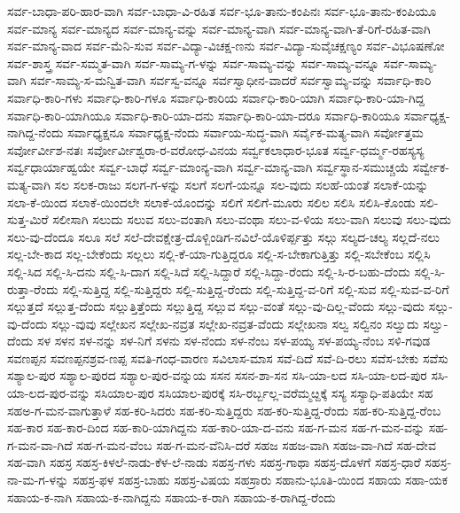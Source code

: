 ಸರ್ವ-ಬಾಧಾ-ಪರಿ-ಹಾರ-ವಾಗಿ
ಸರ್ವ-ಬಾಧಾ-ವಿ-ರಹಿತ
ಸರ್ವ-ಭೂ-ತಾನು-ಕಂಪಿನಃ
ಸರ್ವ-ಭೂ-ತಾನು-ಕಂಪಿಯೂ
ಸರ್ವ-ಮಾನ್ಯ
ಸರ್ವ-ಮಾನ್ಯದ
ಸರ್ವ-ಮಾನ್ಯ-ವನ್ನು
ಸರ್ವ-ಮಾನ್ಯ-ವಾಗಿ
ಸರ್ವ-ಮಾನ್ಯ-ವಾಗಿ-ತೆ-ರಿಗೆ-ರಹಿತ-ವಾಗಿ
ಸರ್ವ-ಮಾನ್ಯ-ವಾದ
ಸರ್ವ-ಮೆನಿ-ಸುವ
ಸರ್ವ-ವಿದ್ಯಾ-ವಿಚಕ್ಷ-ಣನು
ಸರ್ವ-ವಿದ್ಯಾ-ಸುವೈಚಕ್ಷಣ್ಯಂ
ಸರ್ವ-ವಿಭೂಷಣೋ
ಸರ್ವ-ಶಾಸ್ತ್ರ
ಸರ್ವ-ಸಮ್ಮತ-ವಾಗಿ
ಸರ್ವ-ಸಾಮ್ಯ-ಗ-ಳನ್ನು
ಸರ್ವ-ಸಾಮ್ಯ-ವನ್ನು
ಸರ್ವ-ಸಾಮ್ಯ-ವನ್ನೂ
ಸರ್ವ-ಸಾಮ್ಯ-ವಾಗಿ
ಸರ್ವ-ಸಾಮ್ಯ-ಸ-ಮನ್ವಿತ-ವಾಗಿ
ಸರ್ವಸ್ವ-ವನ್ನೂ
ಸರ್ವಸ್ವಾಧೀನ-ವಾದರೆ
ಸರ್ವಸ್ವಾಮ್ಯ-ವನ್ನು
ಸರ್ವಾಧಿ-ಕಾರಿ
ಸರ್ವಾಧಿ-ಕಾರಿ-ಗಳು
ಸರ್ವಾಧಿ-ಕಾರಿ-ಗಳೂ
ಸರ್ವಾಧಿ-ಕಾರಿಯ
ಸರ್ವಾಧಿ-ಕಾರಿ-ಯಾಗಿ
ಸರ್ವಾಧಿ-ಕಾರಿ-ಯಾ-ಗಿದ್ದ
ಸರ್ವಾಧಿ-ಕಾರಿ-ಯಾಗಿಯೂ
ಸರ್ವಾಧಿ-ಕಾರಿ-ಯಾ-ದನು
ಸರ್ವಾಧಿ-ಕಾರಿ-ಯಾ-ದರೂ
ಸರ್ವಾಧಿ-ಕಾರಿಯೂ
ಸರ್ವಾಧ್ಯಕ್ಷ-ನಾಗಿದ್ದ-ನೆಂದು
ಸರ್ವಾಧ್ಯಕ್ಷನೂ
ಸರ್ವಾಧ್ಯಕ್ಷ-ನೆಂದು
ಸರ್ವಾಯ-ಸುದ್ಧ-ವಾಗಿ
ಸರ್ವೈಕ-ಮತ್ಯ-ವಾಗಿ
ಸರ್ವೋತ್ತಮ
ಸರ್ವೋರ್ವೀಶ-ನತಃ
ಸರ್ವೋರ್ವೀಶ್ವರಾ-ರ-ವರೋಧ-ವಿನಯ
ಸರ್ವ್ವಕಲಾಧಾರ-ಭೂತ
ಸರ್ವ್ವ-ಧರ್ಮ್ಮ-ರಹಸ್ಯಸ್ಯ
ಸರ್ವ್ವಧಾರ್ಯಾಹ್ವಯೇ
ಸರ್ವ್ವ-ಬಾಧೆ
ಸರ್ವ್ವ-ಮಾಂನ್ಯ-ವಾಗಿ
ಸರ್ವ್ವ-ಮಾನ್ಯ-ವಾಗಿ
ಸರ್ವ್ವಸ್ಥಾನ-ಸಮುಚ್ಚಯೆ
ಸರ್ವ್ವೇಕ-ಮತ್ಯ-ವಾಗಿ
ಸಲ
ಸಲಕ-ರಾಜು
ಸಲಗ-ಗ-ಳನ್ನು
ಸಲಗೆ
ಸಲಗೆ-ಯನ್ನೂ
ಸಲ-ವುದು
ಸಲಹೆ-ಯಂತೆ
ಸಲಾಕೆ-ಯನ್ನು
ಸಲಾ-ಕೆ-ಯಿಂದ
ಸಲಾಕೆ-ಯಿಂದಲೇ
ಸಲಾಕೆ-ಯೊಂದನ್ನು
ಸಲಿಗೆ
ಸಲಿಗೆ-ಮೂರು
ಸಲಿಲ
ಸಲಿಸಿ
ಸಲಿಸಿ-ಕೊಂಡು
ಸಲಿ-ಸುತ್ತ-ಮಿರೆ
ಸಲೀಸಾಗಿ
ಸಲುದು
ಸಲುವ
ಸಲು-ವಂತಾಗಿ
ಸಲು-ವಂಥಾ
ಸಲು-ವ-ಳಿಯ
ಸಲು-ವಾಗಿ
ಸಲುವು
ಸಲು-ವುದು
ಸಲು-ವು-ದೆಂದೂ
ಸಲೂ
ಸಲೆ
ಸಲೆ-ದೇವಕ್ಷೇತ್ರ-ದೊಳ್ಬಿಂಡಿಗ-ನವಿಲೆ-ಯೊಳಿರ್ಪ್ಪತ್ತು
ಸಲ್ಗು
ಸಲ್ಯದ-ಚಲ್ಯ
ಸಲ್ಲದೆ-ನಲು
ಸಲ್ಲ-ಬೇ-ಕಾದ
ಸಲ್ಲ-ಬೇಕೆಂದು
ಸಲ್ಲಲು
ಸಲ್ಲಿ-ಕೆ-ಯಾ-ಗುತ್ತಿದ್ದರೂ
ಸಲ್ಲಿ-ಸ-ಬೇಕಾಗುತ್ತಿತ್ತು
ಸಲ್ಲಿ-ಸಬೇಕೆಂಬ
ಸಲ್ಲಿಸಿ
ಸಲ್ಲಿ-ಸಿದ
ಸಲ್ಲಿ-ಸಿ-ದನು
ಸಲ್ಲಿ-ಸಿ-ದಾಗ
ಸಲ್ಲಿ-ಸಿದೆ
ಸಲ್ಲಿ-ಸಿದ್ದಾರೆ
ಸಲ್ಲಿ-ಸಿದ್ದಾ-ರೆಂದು
ಸಲ್ಲಿ-ಸಿ-ರ-ಬಹು-ದೆಂದು
ಸಲ್ಲಿ-ಸಿ-ರುತ್ತಾ-ರೆಂದು
ಸಲ್ಲಿ-ಸುತ್ತಿದ್ದ
ಸಲ್ಲಿ-ಸುತ್ತಿದ್ದರು
ಸಲ್ಲಿ-ಸುತ್ತಿದ್ದ-ರೆಂದು
ಸಲ್ಲಿ-ಸುತ್ತಿದ್ದ-ವ-ರಿಗೆ
ಸಲ್ಲಿ-ಸುವ
ಸಲ್ಲಿ-ಸುವ-ವ-ರಿಗೆ
ಸಲ್ಲುತ್ತದೆ
ಸಲ್ಲುತ್ತ-ದೆಂದು
ಸಲ್ಲುತ್ತಿತ್ತೆಂದು
ಸಲ್ಲುತ್ತಿದ್ದ
ಸಲ್ಲುವ
ಸಲ್ಲು-ವಂತೆ
ಸಲ್ಲು-ವು-ದಿಲ್ಲ-ವೆಂದು
ಸಲ್ಲು-ವುದು
ಸಲ್ಲು-ವು-ದೆಂದು
ಸಲ್ಲು-ವುವು
ಸಲ್ಲೇಖನ
ಸಲ್ಲೇಖ-ನವ್ರತ
ಸಲ್ಲೇಖ-ನವ್ರತ-ವೆಂದು
ಸಲ್ಲೇಖನಾ
ಸಲ್ವ
ಸಲ್ವಿನಂ
ಸಲ್ವುದು
ಸಲ್ವು-ದೆಂದು
ಸಳ
ಸಳನ
ಸಳ-ನನ್ನು
ಸಳ-ನಿಗೆ
ಸಳನು
ಸಳ-ನೆಂದು
ಸಳ-ನೆಂಬ
ಸಳ-ಪಯ್ಯ
ಸಳ-ಪಯ್ಯ-ನೆಂಬ
ಸಳಿ-ಗವುಡ
ಸವಣಪ್ಪನ
ಸವಣಪ್ಪನಶ್ರವ-ಣಪ್ಪ
ಸವತಿ-ಗಂಧ-ವಾರಣ
ಸವಿಲಾಸ-ಮಾಸ
ಸವೆ-ದಿದೆ
ಸವೆ-ದಿ-ರಲು
ಸವೆಸ-ಬೇಕು
ಸವೆಸು
ಸಶ್ಯಾಲ-ಪುರ
ಸಶ್ಯಾಲ-ಪುರದ
ಸಶ್ಯಾಲ-ಪುರ-ವನ್ನುಯ
ಸಸನ
ಸಸನ-ಶಾ-ಸನ
ಸಸಿ-ಯಾ-ಲದ
ಸಸಿ-ಯಾ-ಲದ-ಪುರ
ಸಸಿ-ಯಾ-ಲದ-ಪುರ-ವನ್ನು
ಸಸಿಯಾಲ-ಪುರ
ಸಸಿಯಾಲ-ಪುರಕ್ಕೆ
ಸಸಿ-ರರ್ಬ್ಬಲ್ಲ-ವರೆಮ್ಮೞ್ದಕ್ಕೆ
ಸಸ್ಯ
ಸಸ್ಯಾಧಿ-ಪತಿಯೇ
ಸಹ
ಸಹಅ-ಗ-ಮನ-ವಾಗುತ್ತಾಳೆ
ಸಹ-ಕರಿ-ಸಿದರು
ಸಹ-ಕರಿ-ಸುತ್ತಿದ್ದರು
ಸಹ-ಕರಿ-ಸುತ್ತಿದ್ದ-ರೆಂದು
ಸಹ-ಕರಿ-ಸುತ್ತಿದ್ದ-ರೆಂಬ
ಸಹ-ಕಾರ
ಸಹ-ಕಾರ-ದಿಂದ
ಸಹ-ಕಾರಿ-ಯಾಗಿದ್ದನು
ಸಹ-ಕಾರಿ-ಯಾ-ದ-ವನು
ಸಹ-ಗ-ಮನ
ಸಹ-ಗ-ಮನ-ವನ್ನು
ಸಹ-ಗ-ಮನ-ವಾ-ಗಿದೆ
ಸಹ-ಗ-ಮನ-ವೆಂಬ
ಸಹ-ಗ-ಮನ-ವೆನಿಸಿ-ದರೆ
ಸಹಜ
ಸಹಜ-ವಾಗಿ
ಸಹಜ-ವಾ-ಗಿದೆ
ಸಹ-ದೇವ
ಸಹ-ವಾಗಿ
ಸಹಸ್ರ
ಸಹಸ್ರ-ಕಿಳಲೆ-ನಾಡು-ಕೆಳ-ಲೆ-ನಾಡು
ಸಹಸ್ರ-ಗಳು
ಸಹಸ್ರ-ಗಾಥಾ
ಸಹಸ್ರ-ದೊಳಗೆ
ಸಹಸ್ರ-ಧಾರೆ
ಸಹಸ್ರ-ನಾ-ಮ-ಗ-ಳನ್ನು
ಸಹಸ್ರ-ಫಳ
ಸಹಸ್ರ-ಬಾಹು
ಸಹಸ್ರ-ವಿಷಯ
ಸಹಸ್ರಾರು
ಸಹಾನು-ಭೂತಿ-ಯಿಂದ
ಸಹಾಯ
ಸಹಾ-ಯಕ
ಸಹಾಯ-ಕ-ನಾಗಿ
ಸಹಾಯ-ಕ-ನಾಗಿದ್ದನು
ಸಹಾಯ-ಕ-ರಾಗಿ
ಸಹಾಯ-ಕ-ರಾಗಿದ್ದ-ರೆಂದು
